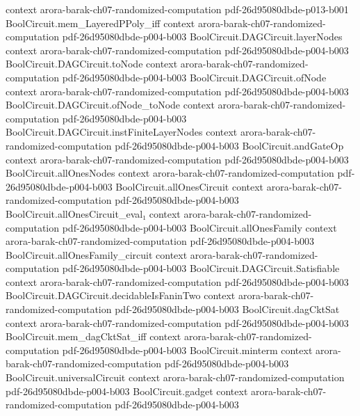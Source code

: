 \begin{theorem}
  {context}
  {arora-barak-ch07-randomized-computation}
  {pdf-26d95080dbde-p013-b001}
\proofstep
  {BoolCircuit.mem_LayeredPPoly_iff}
  {context}
  {arora-barak-ch07-randomized-computation}
  {pdf-26d95080dbde-p004-b003}
\proofstep
  {BoolCircuit.DAGCircuit.layerNodes}
  {context}
  {arora-barak-ch07-randomized-computation}
  {pdf-26d95080dbde-p004-b003}
\proofstep
  {BoolCircuit.DAGCircuit.toNode}
  {context}
  {arora-barak-ch07-randomized-computation}
  {pdf-26d95080dbde-p004-b003}
\proofstep
  {BoolCircuit.DAGCircuit.ofNode}
  {context}
  {arora-barak-ch07-randomized-computation}
  {pdf-26d95080dbde-p004-b003}
\proofstep
  {BoolCircuit.DAGCircuit.ofNode_toNode}
  {context}
  {arora-barak-ch07-randomized-computation}
  {pdf-26d95080dbde-p004-b003}
\proofstep
  {BoolCircuit.DAGCircuit.instFiniteLayerNodes}
  {context}
  {arora-barak-ch07-randomized-computation}
  {pdf-26d95080dbde-p004-b003}
\proofstep
  {BoolCircuit.andGateOp}
  {context}
  {arora-barak-ch07-randomized-computation}
  {pdf-26d95080dbde-p004-b003}
\proofstep
  {BoolCircuit.allOnesNodes}
  {context}
  {arora-barak-ch07-randomized-computation}
  {pdf-26d95080dbde-p004-b003}
\proofstep
  {BoolCircuit.allOnesCircuit}
  {context}
  {arora-barak-ch07-randomized-computation}
  {pdf-26d95080dbde-p004-b003}
\proofstep
  {BoolCircuit.allOnesCircuit_eval₁}
  {context}
  {arora-barak-ch07-randomized-computation}
  {pdf-26d95080dbde-p004-b003}
\proofstep
  {BoolCircuit.allOnesFamily}
  {context}
  {arora-barak-ch07-randomized-computation}
  {pdf-26d95080dbde-p004-b003}
\proofstep
  {BoolCircuit.allOnesFamily_circuit}
  {context}
  {arora-barak-ch07-randomized-computation}
  {pdf-26d95080dbde-p004-b003}
\proofstep
  {BoolCircuit.DAGCircuit.Satisfiable}
  {context}
  {arora-barak-ch07-randomized-computation}
  {pdf-26d95080dbde-p004-b003}
\proofstep
  {BoolCircuit.DAGCircuit.decidableIsFaninTwo}
  {context}
  {arora-barak-ch07-randomized-computation}
  {pdf-26d95080dbde-p004-b003}
\proofstep
  {BoolCircuit.dagCktSat}
  {context}
  {arora-barak-ch07-randomized-computation}
  {pdf-26d95080dbde-p004-b003}
\proofstep
  {BoolCircuit.mem_dagCktSat_iff}
  {context}
  {arora-barak-ch07-randomized-computation}
  {pdf-26d95080dbde-p004-b003}
\proofstep
  {BoolCircuit.minterm}
  {context}
  {arora-barak-ch07-randomized-computation}
  {pdf-26d95080dbde-p004-b003}
\proofstep
  {BoolCircuit.universalCircuit}
  {context}
  {arora-barak-ch07-randomized-computation}
  {pdf-26d95080dbde-p004-b003}
\proofstep
  {BoolCircuit.gadget}
  {context}
  {arora-barak-ch07-randomized-computation}
  {pdf-26d95080dbde-p004-b003}
\proofstep

\end{theorem}
